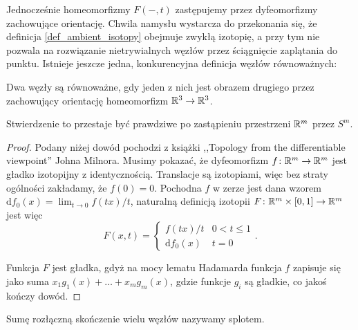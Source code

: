 Jednocześnie homeomorfizmy $F(-,t)$ zastępujemy przez dyfeomorfizmy zachowujące orientację.
Chwila namysłu wystarcza do przekonania się, że definicja \ref{def_ambient_isotopy} obejmuje zwykłą izotopię,
a przy tym nie pozwala na rozwiązanie nietrywialnych węzłów przez ściągnięcie zaplątania do punktu.
Istnieje jeszcze jedna, konkurencyjna definicja węzłów równoważnych:

\begin{definition}
	Dwa węzły są równoważne, gdy jeden z nich jest obrazem drugiego przez zachowujący orientację homeomorfizm $\mathbb R^3 \to \mathbb R^3$.
\end{definition}

Stwierdzenie to przestaje być prawdziwe po zastąpieniu przestrzeni $\mathbb R^m$ przez $S^m$.

\begin{proof}
	Podany niżej dowód pochodzi z książki ,,Topology from the differentiable viewpoint'' Johna Milnora.
	Musimy pokazać, że dyfeomorfizm $f \colon \mathbb R^m \to \mathbb R^m$ jest gładko izotopijny z identycznością.
	Translacje są izotopiami, więc bez straty ogólności zakładamy, że $f(0) = 0$.
	Pochodna $f$ w zerze jest dana wzorem $\mathrm{d}f_0(x) = \lim_{t \to 0} f(tx) /t$,
	naturalną definicją	izotopii $F \colon \mathbb R^m \times [0, 1] \to \mathbb R^m$ jest więc
	\[
		F(x, t) = \begin{cases}
			f(tx) / t & 0 < t \le 1 \\
			\mathrm{d}f_0(x) & t = 0
		\end{cases} .
	\]

	Funkcja $F$ jest gładka,
	gdyż na mocy lematu Hadamarda funkcja $f$ zapisuje się jako suma $x_1 g_1(x) + \ldots + x_mg_m(x)$,
	gdzie funkcje $g_i$ są gładkie, co jakoś kończy dowód.
\end{proof}

\begin{definition}[splot]
	\label{def_link}
	Sumę rozłączną skończenie wielu węzłów nazywamy splotem.
\end{definition}


